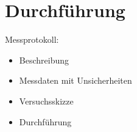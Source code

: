 \section{Durchführung}
\label{sec:Durchführung}

Messprotokoll:
\begin{itemize}
    \item Beschreibung
    \item Messdaten mit Unsicherheiten
    \item Versuchsskizze
    \item Durchführung
\end{itemize}
